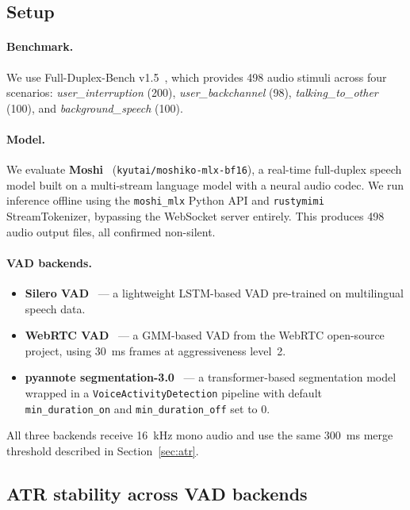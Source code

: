 \documentclass[a4paper]{article}
\begin{document}
\subsection{Setup}

\paragraph{Benchmark.}
We use Full-Duplex-Bench v1.5~\cite{lin2025fullduplexv15}, which provides
498 audio stimuli across four scenarios: \emph{user\_interruption} (200),
\emph{user\_backchannel} (98), \emph{talking\_to\_other} (100), and
\emph{background\_speech} (100).

\paragraph{Model.}
We evaluate \textbf{Moshi}~\cite{defossez2024moshi}
(\texttt{kyutai/moshiko-mlx-bf16}), a real-time full-duplex speech model
built on a multi-stream language model with a neural audio codec.
We run inference offline using the \texttt{moshi\_mlx} Python API and
\texttt{rustymimi} StreamTokenizer, bypassing the WebSocket server entirely.
This produces 498 audio output files, all confirmed non-silent.

\paragraph{VAD backends.}
\begin{itemize}
    \item \textbf{Silero VAD}~\cite{silero2021} --- a lightweight LSTM-based
          VAD pre-trained on multilingual speech data.
    \item \textbf{WebRTC VAD}~\cite{webrtcvad} --- a GMM-based VAD from the
          WebRTC open-source project, using 30~ms frames at aggressiveness
          level~2.
    \item \textbf{pyannote segmentation-3.0}~\cite{plaquet2023,bredin2020}
          --- a transformer-based segmentation model wrapped in a
          \texttt{VoiceActivityDetection} pipeline with default
          \texttt{min\_duration\_on} and \texttt{min\_duration\_off} set
          to 0.
\end{itemize}

All three backends receive 16~kHz mono audio and use the same 300~ms
merge threshold described in Section~\ref{sec:atr}.

\subsection{ATR stability across VAD backends}
\end{document}

